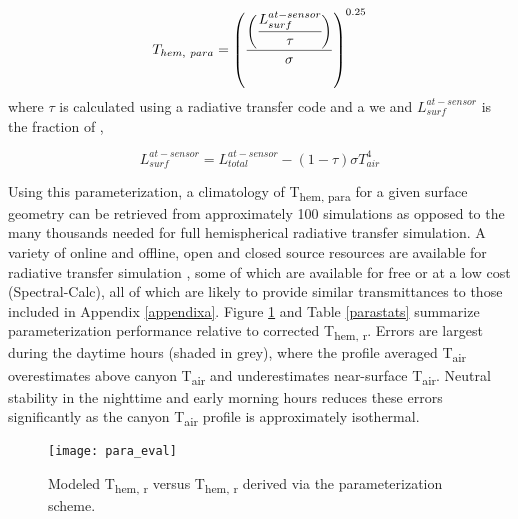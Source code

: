 \begin{bibunit}
\begin{equation}
	\label{para}
	T_{hem, ~para} =\left(\displaystyle\frac{\biggl(\cfrac{\displaystyle L_{surf}^{at-sensor}}{ \displaystyle\tau}\biggr)}{ \displaystyle\sigma}\right)^{0.25}
\end{equation}
\noindent where $\tau$ is calculated using a radiative transfer code and a we and $L_{surf}^{at-sensor}$ is the fraction of ,

\begin{equation}
	\label{para2}
	\displaystyle L_{surf}^{at-sensor} = L_{total}^{at-sensor} - (1-\tau)\sigma T_{air}^4
\end{equation}

Using this parameterization, a climatology of T\textsubscript{hem, para} for a given surface geometry can be retrieved from approximately 100 simulations as opposed to the many thousands needed for full hemispherical radiative transfer simulation. A variety of online and offline, open and closed source resources are available for radiative transfer simulation \citep{Gastellu-Etchegorry1996,Berk1987,Buehler2005}, some of which are available for free or at a low cost (Spectral-Calc), all of which are likely to provide similar transmittances to those included in Appendix \ref{appendixa}. Figure \ref{para_eval} and Table \ref{parastats} summarize parameterization performance relative to corrected T\textsubscript{hem, r}. Errors are largest during the daytime hours (shaded in grey), where the profile averaged T\textsubscript{air} overestimates above canyon T\textsubscript{air} and underestimates near-surface T\textsubscript{air}. Neutral stability in the nighttime and early morning hours reduces these errors significantly as the canyon T\textsubscript{air} profile is approximately isothermal.
 
\begin{figure}[H]
	\centering
	\texttt{[image: para\_eval]}
	\caption{Modeled T\textsubscript{hem, r} versus T\textsubscript{hem, r} derived via the parameterization scheme.}
	\label{para_eval}
\end{figure}
 

\end{bibunit}
